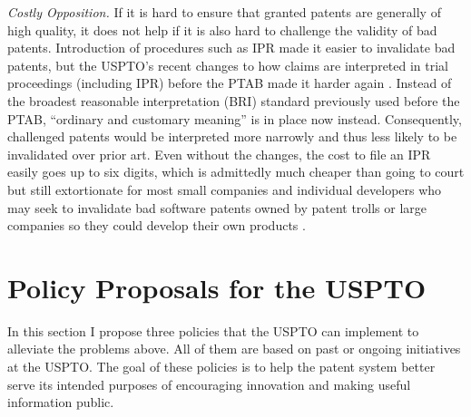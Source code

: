 \documentclass[12pt]{texMemo} %
\begin{document}
\textit{Costly Opposition.} If it is hard to ensure that granted patents are generally of high quality, it does not help if it is also hard to challenge the validity of bad patents. Introduction of procedures such as IPR made it easier to invalidate bad patents, but the USPTO’s recent changes to how claims are interpreted in trial proceedings (including IPR) before the PTAB made it harder again \cite{claim}. Instead of the broadest reasonable interpretation (BRI) standard previously used before the PTAB, “ordinary and customary meaning” is in place now instead. Consequently, challenged patents would be interpreted more narrowly and thus less likely to be invalidated over prior art. Even without the changes, the cost to file an IPR easily goes up to six digits, which is admittedly much cheaper than going to court but still extortionate for most small companies and individual developers who may seek to invalidate bad software patents owned by patent trolls or large companies so they could develop their own products \cite{nayak}.

\section{Policy Proposals for the USPTO}

In this section I propose three policies that the USPTO can implement to alleviate the problems above. All of them are based on past or ongoing initiatives at the USPTO. The goal of these policies is to help the patent system better serve its intended purposes of encouraging innovation and making useful information public.
\end{document}
